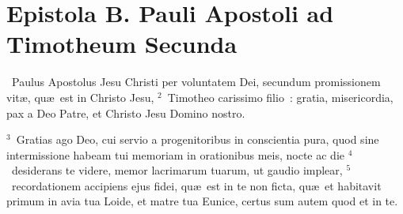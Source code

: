 {\centering \section*{Epistola B. Pauli Apostoli ad Timotheum Secunda}}\thispagestyle{empty}

~Paulus Apostolus Jesu Christi per voluntatem Dei, secundum promissionem vit\ae , qu\ae\ est in Christo Jesu,
${}^{2}$~Timotheo carissimo filio~: gratia, misericordia, pax a Deo Patre, et Christo Jesu Domino nostro.


${}^{3}$~Gratias ago Deo, cui servio a progenitoribus in conscientia pura, quod sine intermissione habeam tui memoriam in orationibus meis, nocte ac die
${}^{4}$~desiderans te videre, memor lacrimarum tuarum, ut gaudio implear,
${}^{5}$~recordationem accipiens ejus fidei, qu\ae\ est in te non ficta, qu\ae\ et habitavit primum in avia tua Loide, et matre tua Eunice, certus sum autem quod et in te.


